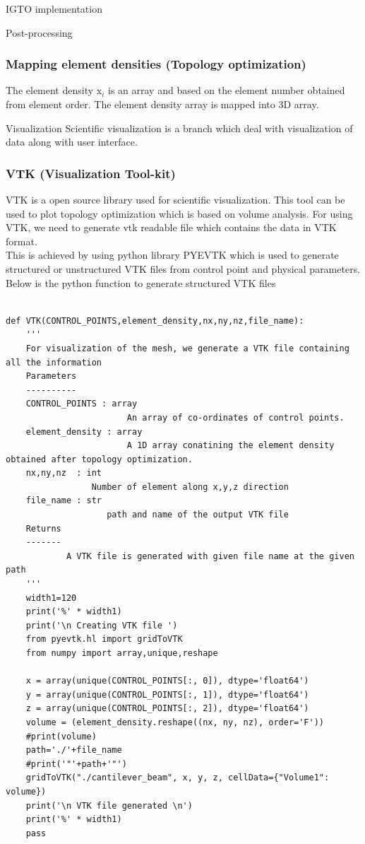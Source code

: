 \documentclass[a4paper,12pt,times]{article}
\begin{document}
\begin{section}{IGTO implementation}
\begin{subsection}{Post-processing}
\subsubsection{Mapping element densities (Topology optimization)}
The element density x$_i$ is an array and based on the element number obtained from element order. The element density array is mapped into 3D array.
\end{subsection}
\begin{subsection}{Visualization}
Scientific visualization is a branch which deal with visualization of data along with user interface. 
\subsubsection{VTK (Visualization Tool-kit)}

VTK is a open source library used for scientific visualization. This tool can be used to plot topology optimization which is based on volume analysis. For using VTK, we need to generate vtk readable file which contains the data in VTK format.\\
This is achieved by using python library PYEVTK which is used to generate structured or unstructured VTK files from control point and physical parameters.\\
Below is the python function to generate structured VTK files
\begin{lstlisting}

def VTK(CONTROL_POINTS,element_density,nx,ny,nz,file_name):
    '''
    For visualization of the mesh, we generate a VTK file containing all the information 
    Parameters
    ----------
    CONTROL_POINTS : array
                        An array of co-ordinates of control points.
    element_density : array
                        A 1D array conatining the element density obtained after topology optimization.
    nx,ny,nz  : int
                 Number of element along x,y,z direction
    file_name : str
                    path and name of the output VTK file
    Returns
    -------
            A VTK file is generated with given file name at the given path
    '''
    width1=120
    print('%' * width1)
    print('\n Creating VTK file ')
    from pyevtk.hl import gridToVTK
    from numpy import array,unique,reshape
    
    x = array(unique(CONTROL_POINTS[:, 0]), dtype='float64')
    y = array(unique(CONTROL_POINTS[:, 1]), dtype='float64')
    z = array(unique(CONTROL_POINTS[:, 2]), dtype='float64')
    volume = (element_density.reshape((nx, ny, nz), order='F'))
    #print(volume)
    path='./'+file_name
    #print('"'+path+'"')
    gridToVTK("./cantilever_beam", x, y, z, cellData={"Volume1": volume})
    print('\n VTK file generated \n')
    print('%' * width1)
    pass
\end{lstlisting}



\end{subsection}
\end{section}
\end{document}
